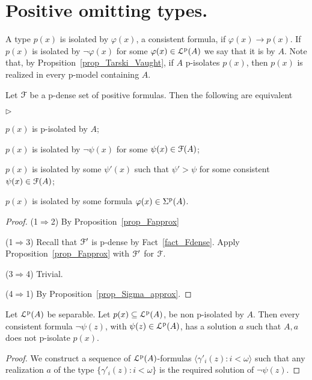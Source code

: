 \documentclass[10pt,oneside]{amsproc}
\newcommand{\mylabel}[1]{{#1}\hfill}
\renewenvironment{itemize}
  {\begin{list}{$\triangleright$}{%
  \setlength{\parskip}{0mm}
  \setlength{\topsep}{.4\baselineskip}
  \setlength{\rightmargin}{0mm}
  \setlength{\listparindent}{0mm}
  \setlength{\itemindent}{0mm}
  \setlength{\labelwidth}{3ex}
  \setlength{\itemsep}{.2\baselineskip}
  \setlength{\parsep}{.2\baselineskip}
  \setlength{\partopsep}{0mm}
  \setlength{\labelsep}{1ex}
  \setlength{\leftmargin}{\labelwidth+\labelsep}
  \let\makelabel\mylabel}}{%
\end{list}}
\renewcommand*{\emph}[1]{%
   \smash{\tikz[baseline]\node[rectangle, fill=teal!25, rounded corners, inner xsep=0.5ex, inner ysep=0.2ex, anchor=base, minimum height = 2.7ex]{\strut #1};}}
\begin{document}
{%
\section{Positive omitting types.}

\def\ceq#1#2#3{\parbox[t]{30ex}{$\displaystyle #1$}\parbox{4ex}{\hfil $#2$}{$\displaystyle #3$}}

A type $p(x)$ is isolated by $\varphi(x)$, a consistent formula, if $\varphi(x)\rightarrow p(x)$.
If $p(x)$ is isolated by $\neg\varphi(x)$ for some $\varphi(x)\in{\EuScript L}^{\rm p}(A)$ we say that it is \emph{p-isolated\/} by $A$.
Note that, by Propsition~\ref{prop_Tarski_Vaught}, if $A$ p-isolates $p(x)$, then $p(x)$ is realized in every p-model containing $A$.

\begin{fact}\label{fact_isolation}
  Let ${\EuScript F}$ be a p-dense set of positive formulas.
  Then the following are equivalent
\begin{itemize}
  \item[1.] $p(x)$ is p-isolated by $A$;
  \item[2.] $p(x)$ is isolated by $\neg\psi(x)$ for some $\psi(x)\in{\EuScript F}(A)$;
  \item[3.] $p(x)$ is isolated by some $\psi'(x)$ such that  $\psi'>\psi$ for some consistent $\psi(x)\in{\EuScript F}(A)$;
  \item[4.] $p(x)$ is isolated by some formula $\varphi(x)\in\Sigma^{\rm p}(A)$.
\end{itemize}
\end{fact}

\begin{proof}
  (1$\Rightarrow$2) By Proposition~\ref{prop_Fapprox}
  
  (1$\Rightarrow$3) Recall that ${\EuScript F}'$ is p-dense by Fact~\ref{fact_Fdense}.
  Apply Proposition~\ref{prop_Fapprox} with ${\EuScript F}'$ for ${\EuScript F}$.

  (3$\Rightarrow$4) Trivial.

  (4$\Rightarrow$1) By Proposition~\ref{prop_Sigma_approx}.
\end{proof}


\begin{lemma}\label{lem_kuratowskiUlam}
  Let ${\EuScript L}^{\rm p}(A)$ be separable.
  Let $p(x)\subseteq{\EuScript L}^{\rm p}(A)$, be non p-isolated by $A$.
  Then every consistent formula $\neg\psi(z)$, with $\psi(z)\in{\EuScript L}^{\rm p}(A)$, has a solution $a$ such that $A,a$ does not p-isolate $p(x)$.
  \end{lemma}
  \begin{proof}
  We construct a sequence of ${\EuScript L}^{\rm p}(A)$-formulas $\langle\gamma'_i(z):i<\omega\rangle$ such that any realization $a$ of the type $\big\{\gamma'_i(z):i<\omega\big\}$ is the required solution of $\neg\psi(z)$.
  

\end{proof}}
\end{document}
